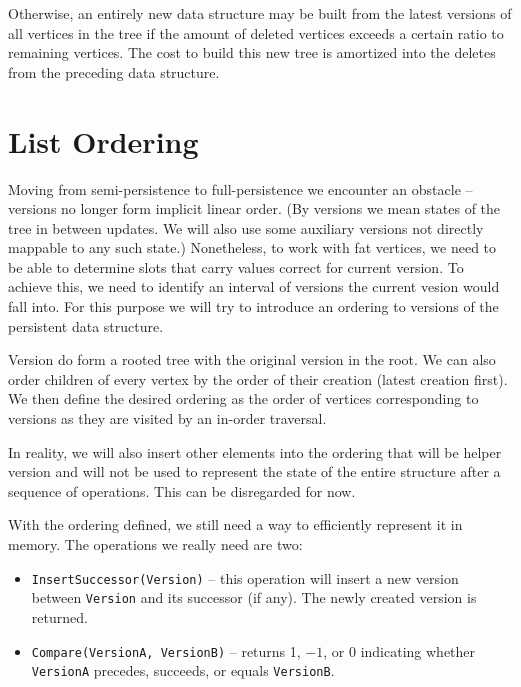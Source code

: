Otherwise, an entirely new data structure may be built from the latest versions of all vertices in the tree if the amount of deleted vertices exceeds a certain ratio to remaining vertices. The cost to build this new tree is amortized into the deletes from the preceding data structure.



\section{List Ordering}

Moving from semi-persistence to full-persistence we encounter an obstacle -- versions no longer form implicit linear order. (By versions we mean states of the tree in between updates. We will also use some auxiliary versions not directly mappable to any such state.) Nonetheless, to work with fat vertices, we need to be able to determine slots that carry values correct for current version. To achieve this, we need to identify an interval of versions the current vesion would fall into. For this purpose we will try to introduce an ordering to versions of the persistent data structure.

Version do form a rooted tree with the original version in the root. We can also order children of every vertex by the order of their creation (latest creation first). We then define the desired ordering as the order of vertices corresponding to versions as they are visited by an in-order traversal. %

In reality, we will also insert other elements into the ordering that will be helper version and will not be used to represent the state of the entire structure after a sequence of operations. This can be disregarded for now.

With the ordering defined, we still need a way to efficiently represent it in memory. The operations we really need are two:

\begin{itemize}
	\item \texttt{InsertSuccessor(Version)} -- this operation will insert a new version between \texttt{Version} and its successor (if any). The newly created version is returned.
	\item \texttt{Compare(VersionA, VersionB)} -- returns 1, $-1$, or 0 indicating whether \texttt{VersionA} precedes, succeeds, or equals \texttt{VersionB}.
\end{itemize}

